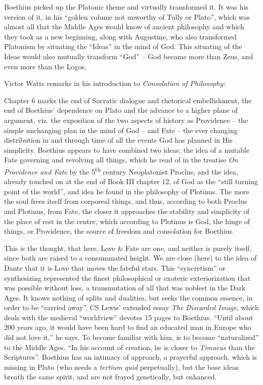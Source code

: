 Boethius picked up the Platonic theme and virtually transformed it. It was his version of it, in his ``golden volume not unworthy of Tully or Plato'', which was almost all that the Middle Ages would know of ancient philosophy and which they took as a new beginning, along with Augustine, who also transformed Platonism by situating the ``Ideas'' in the mind of God. This situating of the Ideas would also mutually transform ``God'' -- God became more than Zeus, and even more than the Logos.

Victor Watts remarks in his introduction to \emph{Consolation of Philosophy:}

\begin{quotex}
Chapter 6 marks the end of Socratic dialogue and rhetorical embellishment, the end of Boethius' dependence on Plato and the advance to a higher plane of argument, viz. the exposition of the two aspects of history as Providence -- the simple unchanging plan in the mind of God -- and Fate -- the ever changing distribution in and through time of all the events God has planned in His simplicity. Boethius appears to have combined two ideas; the idea of a mutable Fate governing and revolving all things, which he read of in the treatise \emph{On Providence and Fate} by the 5\textsuperscript{th} century Neoplatonist Proclus, and the idea, already touched on at the end of Book III chapter 12, of God as the ``still turning point of the world'', and idea he found in the philosophy of Plotinus. The more the soul frees itself from corporeal things, and thus, according to both Proclus and Plotinus, from Fate, the closer it approaches the stability and simplicity of the place of rest in the centre, which according to Plotinus is God, the hinge of things, or Providence, the source of freedom and consolation for Boethius.
\end{quotex}


This is the thought, that here, Love \& Fate are one, and neither is purely itself, since both are raised to a consummated height. We are close (here) to the idea of Dante that it is Love that moves the fateful stars. This ``syncretism'' or synthesizing represented the finest philosophical or exoteric exteriorization that was possible without loss, a transmutation of all that was noblest in the Dark Ages. It knows nothing of splits and dualities, but seeks the common essence, in order to be ``carried away''. CS Lewis' extended essay \emph{The Discarded Image}, which deals with the medieval ``worldview'' devotes 15 pages to Boethius. ``Until about 200 years ago, it would have been hard to find an educated man in Europe who did not love it,'' he says. To become familiar with him, is to become ``naturalized'' to the Middle Ages. ``In his account of creation, he is closer to \emph{Timaeus} than the Scriptures''. Boethius has an intimacy of approach, a prayerful approach, which is missing in Plato (who needs a \emph{tertium quid} perpetually), but the base ideas breath the same spirit, and are not frayed genetically, but enhanced.

